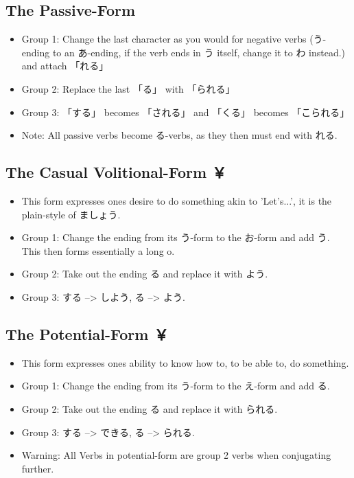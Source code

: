 \documentclass{article}
\newcommand\tabyon[1][0.4cm]{\hspace*{#1}}
\begin{document}
\subsection{The Passive-Form }
\begin{itemize} 
\item Group 1: Change the last character as you would for negative verbs (う-ending to an あ-ending, if the verb ends in う itself, change it to わ instead.) and attach 「れる」
\item Group 2: Replace the last 「る」 with 「られる」
\item Group 3: 「する」 becomes 「される」 and 「くる」 becomes 「こられる」
\item Note: All passive verbs become る-verbs, as they then must end with れる.
\end{itemize}
\subsection{The Casual Volitional-Form ￥}
\begin{itemize}
\item This form expresses ones desire to do something akin to 'Let's...',
 it is the plain-style of ましょう.
\item Group 1: Change the ending from its う-form to the お-form and add う.
This then forms essentially a long o.
\item Group 2: Take out the ending る and replace it with よう.
\item Group 3: する --> しよう, \tabyon {}る --> よう.
\end{itemize}
\subsection{The Potential-Form ￥}
\begin{itemize}
\item This form expresses ones ability to know how to, to be able to, do something.
\item Group 1: Change the ending from its う-form to the え-form and add る.
\item Group 2: Take out the ending る and replace it with られる.
\item Group 3: する --> できる, \tabyon {}る --> られる.
\item Warning: All Verbs in potential-form are group 2 verbs when conjugating further.
\end{itemize}
\end{document}
